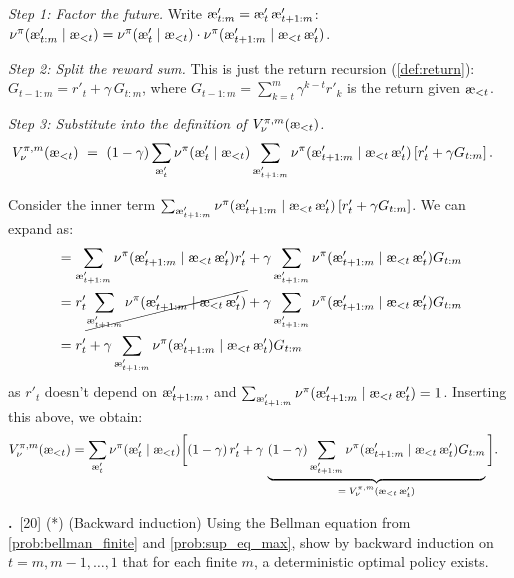 \documentclass[fontsize=11pt, parskip=half]{scrartcl}
\theoremstyle{definition}
\newenvironment{solution}{%
    \begin{tcolorbox}[colback=black!5!white, colframe=black!50!white,
      title={\textbf{Solution}}, fonttitle=\normalfont, breakable]
  }{\end{tcolorbox}}
\newenvironment{solution}{\expandafter\comment}{\expandafter\endcomment}
\newcommand{\mysubsection}[2]{\par\medskip\noindent\refstepcounter{subsection}\textbf{\thesubsection.}~#2\par\smallskip}
\newcommand{\aes}{\textnormal{\ae}}
\begin{document}
\begin{solution}
\emph{Step 1: Factor the future.}
Write $\aes'_{t:m} = \aes'_t\, \aes'_{t+1:m}$:
$\nu^\pi(\aes'_{t:m} \mid \aes_{<t}) = \nu^\pi(\aes'_t \mid \aes_{<t}) \cdot \nu^\pi(\aes'_{t+1:m} \mid \aes_{<t}\, \aes'_t)$.

\emph{Step 2: Split the reward sum.}
This is just the return recursion (\cref{def:return}): $G_{t-1:m} = r'_t + \gamma\, G_{t:m}$, where $G_{t-1:m} = \sum_{k=t}^{m} \gamma^{k-t} r'_k$ is the return given $\aes_{<t}$.

\emph{Step 3: Substitute into the definition of $V_\nu^{\pi,m}(\aes_{<t})$.}
\begin{align*}
    V_\nu^{\pi,m}(\aes_{<t})
    ~&=~ (1-\gamma) \sum_{\aes'_t} \nu^\pi(\aes'_t \mid \aes_{<t}) 
 \sum_{\aes'_{t+1:m}} \nu^\pi(\aes'_{t+1:m} \mid \aes_{<t}\, \aes'_t) \left[ r'_t + \gamma G_{t:m} \right].
\end{align*}

Consider the inner term $\sum_{\aes'_{t+1:m}} \nu^\pi(\aes'_{t+1:m} \mid \aes_{<t}\, \aes'_t) 
\left[ r'_t + \gamma G_{t:m} \right]$. 
We can expand as:
\begin{align*}
&= \sum_{\aes'_{t+1:m}} \nu^\pi(\aes'_{t+1:m} \mid \aes_{<t}\, \aes'_t) r'_t 
+ \gamma \sum_{\aes'_{t+1:m}} \nu^\pi(\aes'_{t+1:m} \mid \aes_{<t}\, \aes'_t) G_{t:m} \\
&= r'_t \cancel{\sum_{\aes'_{t+1:m}} \nu^\pi(\aes'_{t+1:m} \mid \aes_{<t}\, \aes'_t)}  
+ \gamma \sum_{\aes'_{t+1:m}} \nu^\pi(\aes'_{t+1:m} \mid \aes_{<t}\, \aes'_t) G_{t:m} \\
&= r'_t
+ \gamma \sum_{\aes'_{t+1:m}} \nu^\pi(\aes'_{t+1:m} \mid \aes_{<t}\, \aes'_t) G_{t:m}
\end{align*}
as $r'_t$ doesn't depend on $\aes'_{t+1:m}$, and $\sum_{\aes'_{t+1:m}} \nu^\pi(\aes'_{t+1:m} \mid \aes_{<t}\, \aes'_t) = 1$.
Inserting this above, we obtain:
\begin{align*}
    V_\nu^{\pi,m}(\aes_{<t})
    &= \sum_{\aes'_t} \nu^\pi(\aes'_t \mid \aes_{<t}) \bigg[ (1-\gamma)\, r'_t + 
    \gamma\, \underbrace{(1-\gamma) \sum_{\aes'_{t+1:m}} \nu^\pi(\aes'_{t+1:m} \mid \aes_{<t}\, \aes'_t)G_{t:m}}_{=\; V_\nu^{\pi,m}(\aes_{<t}\, \aes'_t)} \bigg].
\end{align*}
\end{solution}

\mysubsection{3}{[20] (*) (Backward induction) \label{prob:backward_induction}
Using the Bellman equation from \cref{prob:bellman_finite} and \cref{prob:sup_eq_max}, show by backward induction on $t = m, m-1, \ldots, 1$ that for each finite $m$, a deterministic optimal policy exists.}
\end{document}
